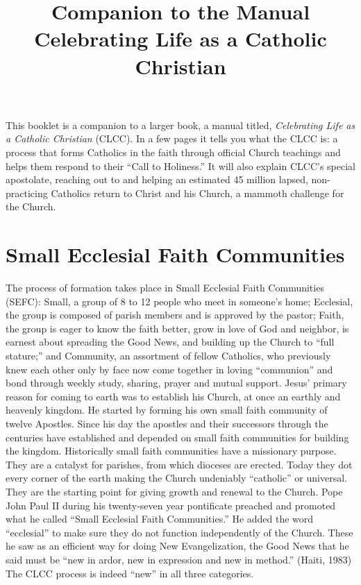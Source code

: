 \documentclass{article}
\begin{document}

\title{\textbf{Companion to the Manual} \\
               Celebrating Life as a Catholic Christian}
\date{}
\maketitle

\setcounter{secnumdepth}{0}

This booklet is a companion to a larger book, a manual titled, \emph{Celebrating Life
as a Catholic Christian} (CLCC). In a few pages it tells you what the CLCC is: a
process that forms Catholics in the faith through official Church teachings and
helps them respond to their ``Call to Holiness.'' It will also explain CLCC's
special apostolate, reaching out to and helping an estimated 45 million lapsed,
non-practicing Catholics return to Christ and his Church, a mammoth challenge
for the Church.

\section{Small Ecclesial Faith Communities}

The process of formation takes place in Small Ecclesial Faith Communities
(SEFC): Small, a group of 8 to 12 people who meet in someone's home; Ecclesial,
the group is composed of parish members and is approved by the pastor; Faith,
the group is eager to know the faith better, grow in love of God and neighbor,
is earnest about spreading the Good News, and building up the Church to ``full
stature;'' and Community, an assortment of fellow Catholics, who previously knew
each other only by face now come together in loving ``communion'' and bond
through weekly study, sharing, prayer and mutual support.
Jesus' primary reason for coming to earth was to establish his Church, at once
an earthly and heavenly kingdom. He started by forming his own small faith
community of twelve Apostles. Since his day the apostles and their successors
through the centuries have established and depended on small faith communities
for building the kingdom. Historically small faith communities have a missionary
purpose. They are a catalyst for parishes, from which dioceses are
erected. Today they dot every corner of the earth making the Church undeniably
``catholic'' or universal. They are the starting point for giving growth and
renewal to the Church.
Pope John Paul II during his twenty-seven year pontificate preached and promoted
what he called ``Small Ecclesial Faith Communities.'' He added the word
``ecclesial'' to make sure they do not function independently of the
Church. These he saw as an efficient way for doing New Evangelization, the Good
News that he said must be ``new in ardor, new in expression and new in method.''
(Haiti, 1983) The CLCC process is indeed ``new'' in all three categories.
\end{document}

